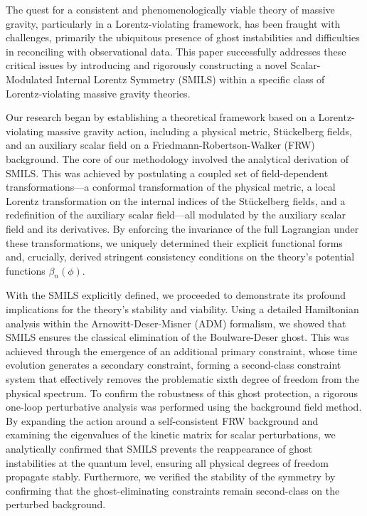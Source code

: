 \documentclass[twocolumn]{aastex631}
\begin{document}
The quest for a consistent and phenomenologically viable theory of massive gravity, particularly in a Lorentz-violating framework, has been fraught with challenges, primarily the ubiquitous presence of ghost instabilities and difficulties in reconciling with observational data. This paper successfully addresses these critical issues by introducing and rigorously constructing a novel Scalar-Modulated Internal Lorentz Symmetry (SMILS) within a specific class of Lorentz-violating massive gravity theories.

Our research began by establishing a theoretical framework based on a Lorentz-violating massive gravity action, including a physical metric, Stückelberg fields, and an auxiliary scalar field on a Friedmann-Robertson-Walker (FRW) background. The core of our methodology involved the analytical derivation of SMILS. This was achieved by postulating a coupled set of field-dependent transformations—a conformal transformation of the physical metric, a local Lorentz transformation on the internal indices of the Stückelberg fields, and a redefinition of the auxiliary scalar field—all modulated by the auxiliary scalar field and its derivatives. By enforcing the invariance of the full Lagrangian under these transformations, we uniquely determined their explicit functional forms and, crucially, derived stringent consistency conditions on the theory's potential functions $\beta_n(\phi)$.

With the SMILS explicitly defined, we proceeded to demonstrate its profound implications for the theory's stability and viability. Using a detailed Hamiltonian analysis within the Arnowitt-Deser-Misner (ADM) formalism, we showed that SMILS ensures the classical elimination of the Boulware-Deser ghost. This was achieved through the emergence of an additional primary constraint, whose time evolution generates a secondary constraint, forming a second-class constraint system that effectively removes the problematic sixth degree of freedom from the physical spectrum. To confirm the robustness of this ghost protection, a rigorous one-loop perturbative analysis was performed using the background field method. By expanding the action around a self-consistent FRW background and examining the eigenvalues of the kinetic matrix for scalar perturbations, we analytically confirmed that SMILS prevents the reappearance of ghost instabilities at the quantum level, ensuring all physical degrees of freedom propagate stably. Furthermore, we verified the stability of the symmetry by confirming that the ghost-eliminating constraints remain second-class on the perturbed background.
\end{document}
